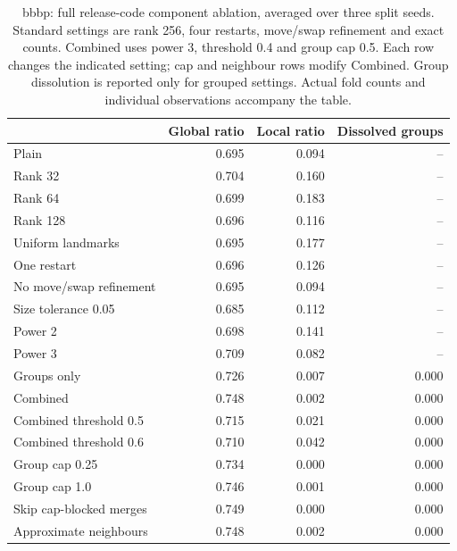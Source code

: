 \begin{table}[htbp]\centering\small
\begin{tabular}{lrrr}
\toprule
 & Global ratio & Local ratio & Dissolved groups \\
\midrule
Plain & 0.695 & 0.094 & -- \\
Rank 32 & 0.704 & 0.160 & -- \\
Rank 64 & 0.699 & 0.183 & -- \\
Rank 128 & 0.696 & 0.116 & -- \\
Uniform landmarks & 0.695 & 0.177 & -- \\
One restart & 0.696 & 0.126 & -- \\
No move/swap refinement & 0.695 & 0.094 & -- \\
Size tolerance 0.05 & 0.685 & 0.112 & -- \\
Power 2 & 0.698 & 0.141 & -- \\
Power 3 & 0.709 & 0.082 & -- \\
Groups only & 0.726 & 0.007 & 0.000 \\
Combined & 0.748 & 0.002 & 0.000 \\
Combined threshold 0.5 & 0.715 & 0.021 & 0.000 \\
Combined threshold 0.6 & 0.710 & 0.042 & 0.000 \\
Group cap 0.25 & 0.734 & 0.000 & 0.000 \\
Group cap 1.0 & 0.746 & 0.001 & 0.000 \\
Skip cap-blocked merges & 0.749 & 0.000 & 0.000 \\
Approximate neighbours & 0.748 & 0.002 & 0.000 \\
\bottomrule
\end{tabular}

\caption{bbbp: full release-code component ablation, averaged over three split seeds. Standard settings are rank 256, four restarts, move/swap refinement and exact counts. Combined uses power 3, threshold 0.4 and group cap 0.5. Each row changes the indicated setting; cap and neighbour rows modify Combined. Group dissolution is reported only for grouped settings. Actual fold counts and individual observations accompany the table.}\end{table}
